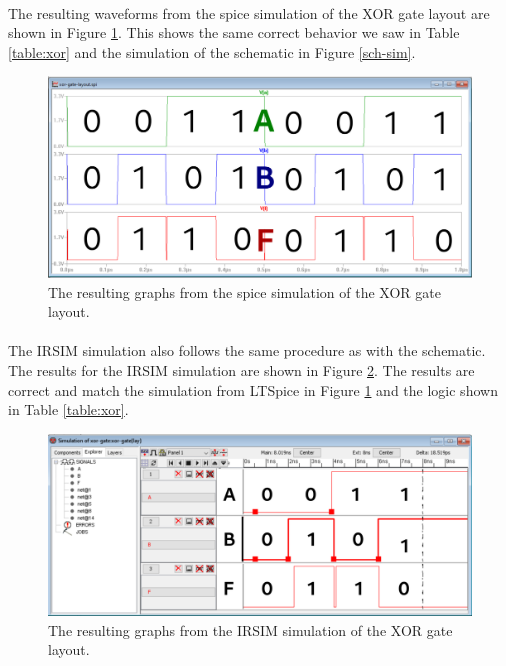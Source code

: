 \documentclass{article}
\begin{document}
  \paragraph{}
  The resulting waveforms from the spice simulation of the XOR gate layout are shown in Figure \ref{fig:spice-sim-lay}. This shows the same correct behavior we saw in Table \ref{table:xor} and the simulation of the schematic in Figure \ref{sch-sim}.


  \begin{figure}[H]
    \centering
    \includegraphics[width=0.9\linewidth, frame]{screenshots/spice-sim-layout.png}
    \caption{The resulting graphs from the spice simulation of the XOR gate layout.}
    \label{fig:spice-sim-lay}
  \end{figure}

  \paragraph{}
  The IRSIM simulation also follows the same procedure as with the schematic. The results for the IRSIM simulation are shown in Figure \ref{fig:irsim-lay}. The results are correct and match the simulation from LTSpice in Figure \ref{fig:spice-sim-lay} and the logic shown in Table \ref{table:xor}.



  \begin{figure}[H]
    \centering
    \includegraphics[width=0.9\linewidth, frame]{screenshots/irsim-layout.png}
    \caption{The resulting graphs from the IRSIM simulation of the XOR gate layout.}
    \label{fig:irsim-lay}
  \end{figure}
\end{document}
